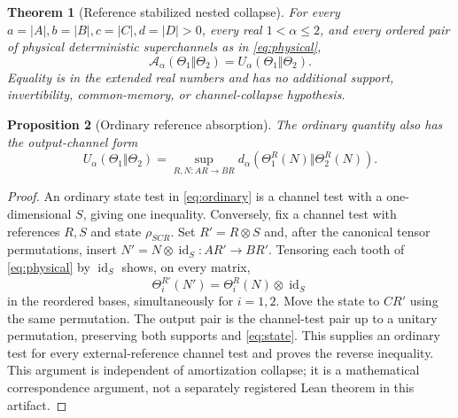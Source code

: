 \documentclass[11pt]{article}
\newcommand{\id}{\operatorname{id}}
\newcommand{\U}{U_\alpha}
\newcommand{\Adiv}{\mathcal A_\alpha}
\newtheorem{theorem}{Theorem}
\newtheorem{proposition}[theorem]{Proposition}
\theoremstyle{remark}
\begin{document}
\begin{theorem}[Reference stabilized nested collapse]\label{thm:main}
For every $a=|A|,b=|B|,c=|C|,d=|D|>0$, every real $1<\alpha\leq2$, and every
ordered pair of physical deterministic superchannels as in
\eqref{eq:physical},
\begin{equation}\label{eq:collapse}
 \Adiv(\Theta_1\Vert\Theta_2)=\U(\Theta_1\Vert\Theta_2).
\end{equation}
Equality is in the extended real numbers and has no additional support,
invertibility, common-memory, or channel-collapse hypothesis.
\end{theorem}

\begin{proposition}[Ordinary reference absorption]\label{prop:absorb}
The ordinary quantity also has the output-channel form
\begin{equation}\label{eq:absorb}
 \U(\Theta_1\Vert\Theta_2)=
 \sup_{R,N:AR\to BR}d_\alpha(\Theta_1^R(N)\Vert\Theta_2^R(N)).
\end{equation}
\end{proposition}
\begin{proof}
An ordinary state test in \eqref{eq:ordinary} is a channel test with a
one-dimensional $S$, giving one inequality. Conversely, fix a channel test
with references $R,S$ and state $\rho_{SCR}$. Set $R'=R\otimes S$ and, after
the canonical tensor permutations, insert $N'=N\otimes\id_S:AR'\to BR'$.
Tensoring each tooth of \eqref{eq:physical} by $\id_S$ shows, on every matrix,
\[
 \Theta_i^{R'}(N')=\Theta_i^R(N)\otimes\id_S
\]
in the reordered bases, simultaneously for $i=1,2$. Move the state to
$CR'$ using the same permutation. The output pair is the channel-test pair
up to a unitary permutation, preserving both supports and
\eqref{eq:state}. This supplies an ordinary test for every external-reference
channel test and proves the reverse inequality. This argument is independent
of amortization collapse; it is a mathematical correspondence argument, not
a separately registered Lean theorem in this artifact.
\end{proof}
\end{document}
